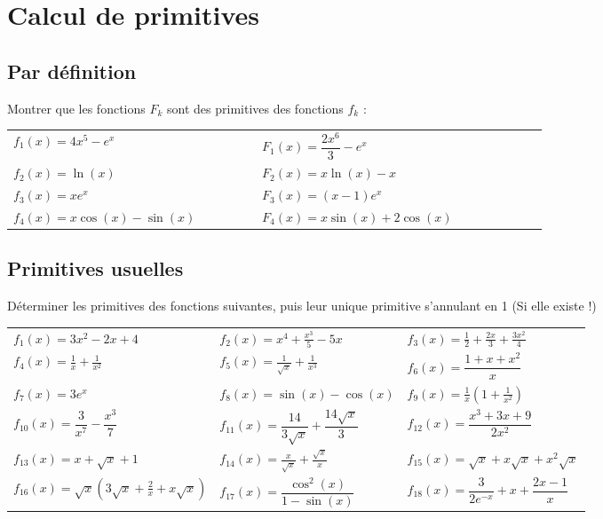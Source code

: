 \documentclass[oneside,12pt]{article}          %
\begin{document}
\section{Calcul de primitives}

\subsection{Par définition}
Montrer que les fonctions $F_k$ sont des primitives des fonctions $f_k$ :

\begin{tabular}{p{0.3\linewidth}p{0.4\linewidth}}
$f_1(x) = 4x^5 - e^x$ & $F_1(x) = \dfrac{2x^6}{3} - e^x$ \\
$f_2(x) = \ln(x)$ & $F_2(x) = x \ln(x) - x$ \\
$f_3(x) = xe^x$ &  $F_3(x) = (x-1)e^x$ \\
$f_4(x) = x \cos(x) - \sin(x)$ &  $F_4(x) = x \sin(x) + 2 \cos(x)$
\end{tabular}



\subsection{Primitives usuelles}
Déterminer les primitives des fonctions suivantes, puis leur unique primitive s'annulant en 1 (Si elle existe !)\\
\renewcommand{\arraystretch}{2}
\begin{tabular}{ p{} p{} p{} }
	$f_{1}(x)=3x^{2}-2x+4$ & $f_{2}(x)=x^{4}+\frac{x^{3}}{5}-5x$ & $f_{3}(x)=\frac{1}{2}+\frac{2x}{3}+\frac{3x^{2}}{4} $\\
	$f_{4}(x)=\frac{1}{x}+\frac{1}{x^{2}}$ & $f_{5}(x)=\frac{1}{\sqrt{x}}+\frac{1}{x^{3}}$ & $f_{6}(x)=\dfrac{1+x+x^{2}}{x}$ \\
	$f_{7}(x)=3e^{x}$ & $f_{8}(x)=\sin{(x)}-\cos{(x)}$ & $f_9(x)=\frac{1}{x}\left(1+\frac{1}{x^2}\right)$\\
	$f_{10}(x)=\dfrac{3}{x^7}-\dfrac{x^3}{7}$ & $f_{11}(x)=\dfrac{14}{3\sqrt{x}}+\dfrac{14\sqrt{x}}{3}$ & $f_{12}(x)=\dfrac{x^3+3x+9}{2x^2}$ \\
	$f_{13}(x)=x+\sqrt{x}+1$ & $f_{14}(x)=\frac{x}{\sqrt{x}}+\frac{\sqrt{x}}{x}$ & $f_{15}(x)=\sqrt{x}+x\sqrt{x}+x^2\sqrt{x}$ \\
	$f_{16}(x)=\sqrt{x}\left(3\sqrt{x}+\frac{2}{x}+x\sqrt{x}\right)$ & $f_{17}(x)=\dfrac{\cos^2(x)}{1-\sin(x)}$ & $f_{18}(x)=\dfrac{3}{2e^{-x}}+x+\dfrac{2x-1}{x}$
\end{tabular}
\end{document}
